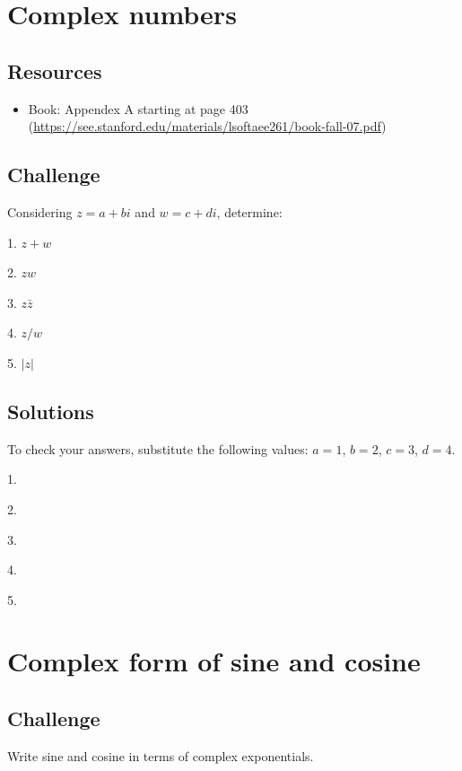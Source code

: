 \newpage
\section{Complex numbers}

\subsection*{Resources}
\begin{itemize}
    \item Book: Appendex A starting at page 403 (\url{https://see.stanford.edu/materials/lsoftaee261/book-fall-07.pdf})
\end{itemize}

\subsection*{Challenge}
Considering $z=a+bi$ and $w=c+di$, determine:

1. $z + w$

2. $zw$

3. $z \bar{z}$

4. $z/w$

5. $|z|$

\subsection*{Solutions}
To check your answers, substitute the following values: $a=1$, $b=2$, $c=3$, $d=4$.

1.\\

2.\\

3.\\

4.\\

5.\\




\newpage

\section{Complex form of sine and cosine}

\subsection*{Challenge}
Write sine and cosine in terms of complex exponentials.

